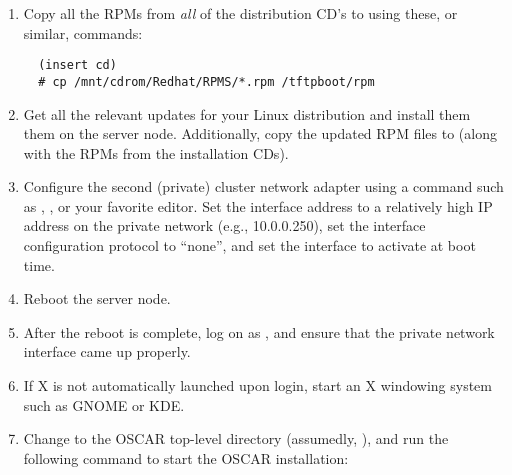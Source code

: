 \begin {enumerate}
\begin{verbatim}
  # cd
  # tar zxf <filename>
\end{verbatim}
  
  Where  is either
   (regular distribution) or
   (extra crispy
    distribution).

  
\item Copy all the RPMs from \emph{all} of the distribution CD's to
   using these, or similar, commands:

\begin{verbatim}
  (insert cd)
  # cp /mnt/cdrom/Redhat/RPMS/*.rpm /tftpboot/rpm
\end{verbatim}

  
\item Get all the relevant updates for your Linux distribution and
  install them them on the server node.  Additionally, copy the
  updated RPM files to  (along with the RPMs from
  the installation CDs).
  
  
\item Configure the second (private) cluster network adapter using a
  command such as , , or your favorite editor.
  Set the interface address to a relatively high IP address on the
  private network (e.g., 10.0.0.250), set the interface configuration
  protocol to ``none'', and set the interface to activate at boot
  time.


\item Reboot the server node.  
  
\item After the reboot is complete, log on as , and ensure
  that the private network interface came up properly.
  
\item If X is not automatically launched upon  login, start
  an X windowing system such as GNOME or KDE.
  
\item Change to the OSCAR top-level directory (assumedly,
  ), and run the following
  command to start the OSCAR installation:


\end{enumerate}
